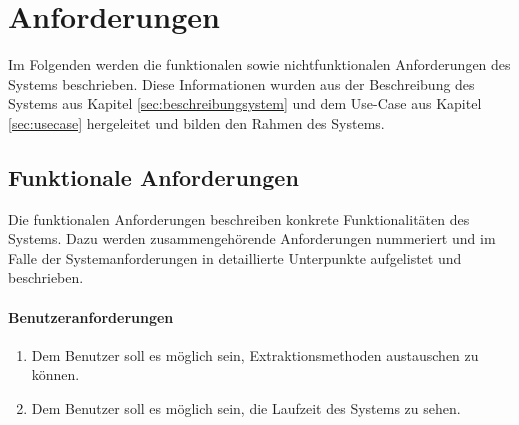 \section{Anforderungen}
Im Folgenden werden die funktionalen sowie nichtfunktionalen Anforderungen des Systems beschrieben. Diese Informationen wurden aus der Beschreibung des Systems aus Kapitel \ref{sec:beschreibungsystem} und dem Use-Case aus Kapitel \ref{sec:usecase} hergeleitet und bilden den Rahmen des Systems.
\subsection{Funktionale Anforderungen}
Die funktionalen Anforderungen beschreiben konkrete Funktionalitäten des Systems. Dazu werden zusammengehörende Anforderungen nummeriert und im Falle der Systemanforderungen in detaillierte Unterpunkte aufgelistet und beschrieben.
\paragraph{Benutzeranforderungen}
\begin{enumerate}
	\item Dem Benutzer soll es möglich sein, Extraktionsmethoden austauschen zu können.
	\item Dem Benutzer soll es möglich sein, die Laufzeit des Systems zu sehen.
\end{enumerate}

